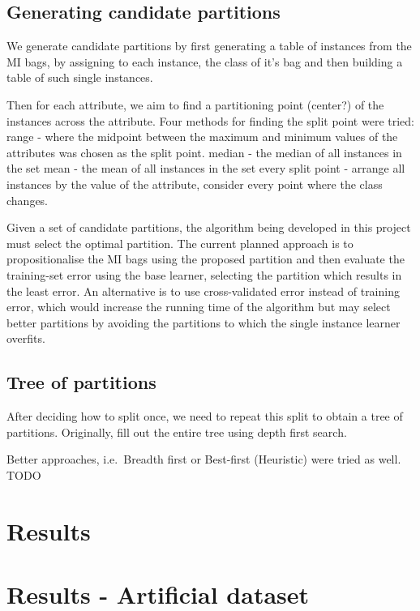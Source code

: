 \documentclass[a4paper,12pt]{article} %
\begin{document}

\subsection{Generating candidate partitions}
We generate candidate partitions by first generating a table of instances from the MI bags, 
    by assigning to each instance, the class of it's bag and then building a table of such 
    single instances. 
    
Then for each attribute, we aim to find a partitioning point (center?) of the instances across the attribute.
Four methods for finding the split point were tried: 
    range - where the midpoint between the maximum and minimum values of the attributes was chosen as the 
        split point.
    median - the median of all instances in the set
    mean - the mean of all instances in the set
    every split point - arrange all instances by the value of the attribute, consider every point where     
        the class changes.

Given a set of candidate partitions, the algorithm being developed in this project must select the optimal partition. 
The current planned approach is to propositionalise the MI bags using the proposed partition and then evaluate the training-set error using the base learner, selecting the partition which results in the least error. An alternative is to use cross-validated error instead of training error, which would increase the running time of the algorithm but may select better partitions by avoiding the partitions to which the single instance learner overfits.

\subsection{Tree of partitions}
After deciding how to split once, we need to repeat this split to obtain a tree of partitions.
Originally, fill out the entire tree using depth first search.

Better approaches, i.e.\ Breadth first or Best-first (Heuristic) were tried as well. TODO


\section{Results}

\section{Results - Artificial dataset}
\end{document}
